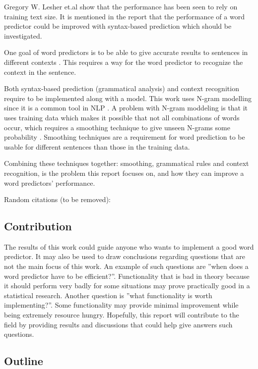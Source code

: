 Gregory W. Lesher et.al \cite{Lesher99effectsof} show that the performance has been seen to rely on training text size. It is mentioned in the report that the performance of a word predictor could be improved with syntax-based prediction which should be investigated.
 
One goal of word predictors is to be able to give accurate results to sentences in different contexts \cite{DBLP:journals/corr/cs-CL-0009027}. This requires a way for the word predictor to recognize the context in the sentence.
 
Both syntax-based prediction (grammatical analysis) and context recognition require to be implemented along with a model. This work uses N-gram modelling since it is a common tool in NLP \cite{Wandmacher}. A problem with N-gram moddeling is that it uses training data which makes it possible that not all combinations of words occur, which requires a smoothing technique to give unseen N-grams some probability \cite{Russel}. Smoothing techniques are a requirement for word prediction to be usable for different sentences than those in the training data.
 
Combining  these techniques together: smoothing, grammatical rules and context recognition, is the problem this report focuses on, and how they can improve a word predictors' performance.

Random citations (to be removed): \cite{keystrokes}\cite{smoothing}\cite{corpus}\cite{aurora}


\subsection{Contribution}
The results of this work could guide anyone who wants to implement a good word predictor. It may also be used to draw conclusions regarding questions that are not the main focus of this work. An example of such questions are ''when does a word predictor have to be efficient?''. Functionality that is bad in theory because it should perform very badly for some situations may prove practically good in a statistical research. Another question is ''what functionality is worth implementing?''. Some functionality may provide minimal improvement while being extremely resource hungry. Hopefully, this report will contribute to the field by providing results and discussions that could help give answers such questions.

\subsection{Outline}
\lipsum[1]